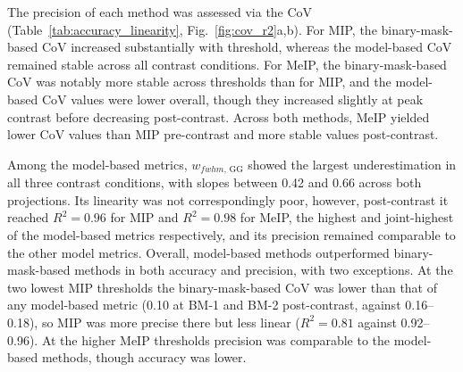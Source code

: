 \documentclass{optica-article}
\begin{document}
The precision of each method was assessed via the CoV (Table~\ref{tab:accuracy_linearity}, Fig.~\ref{fig:cov_r2}a,b). For MIP, the binary-mask-based CoV increased substantially with threshold, whereas the model-based CoV remained stable across all contrast conditions. For MeIP, the binary-mask-based CoV was notably more stable across thresholds than for MIP, and the model-based CoV values were lower overall, though they increased slightly at peak contrast before decreasing post-contrast. Across both methods, MeIP yielded lower CoV values than MIP pre-contrast and more stable values post-contrast.

Among the model-based metrics, $w_{fwhm,\,\mathrm{GG}}$ showed the largest underestimation in all three contrast conditions, with slopes between 0.42 and 0.66 across both projections. Its linearity was not correspondingly poor, however, post-contrast it reached $R^2 = 0.96$ for MIP and $R^2 = 0.98$ for MeIP, the highest and joint-highest of the model-based metrics respectively, and its precision remained comparable to the other model metrics. Overall, model-based methods outperformed binary-mask-based methods in both accuracy and precision, with two exceptions. At the two lowest MIP thresholds the binary-mask-based CoV was lower than that of any model-based metric (0.10 at BM-1 and BM-2 post-contrast, against 0.16--0.18), so MIP was more precise there but less linear ($R^2 = 0.81$ against 0.92--0.96). At the higher MeIP thresholds precision was comparable to the model-based methods, though accuracy was lower.
\end{document}
